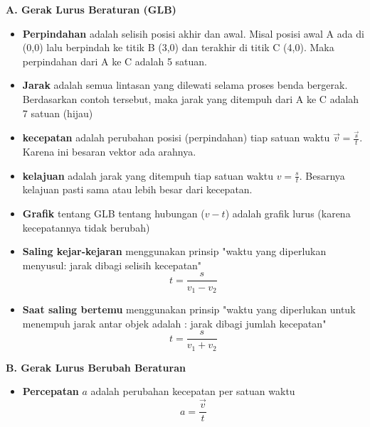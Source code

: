 \documentclass[10pt,a4paper]{article}
\begin{document}
\begin{multicols*}{2}
\begin{catatan}\textbf{A. Gerak Lurus Beraturan (GLB)}\end{catatan}
\begin{itemize}[itemsep=0mm,topsep=0mm,leftmargin=*]
\item \textbf{Perpindahan} adalah selisih posisi akhir dan awal. Misal posisi awal A ada di (0,0) lalu berpindah ke titik B (3,0) dan terakhir di titik C (4,0). Maka perpindahan dari A ke C adalah 5 satuan.
\item \textbf{Jarak} adalah semua lintasan yang dilewati selama proses benda bergerak. Berdasarkan contoh tersebut, maka jarak yang ditempuh dari A ke C adalah 7 satuan (hijau)

\item \textbf{kecepatan} adalah perubahan posisi (perpindahan) tiap satuan waktu $\vec{v} = \frac{\vec{s}}{t} $. Karena ini besaran vektor ada arahnya.
\item \textbf{kelajuan} adalah jarak yang ditempuh tiap satuan waktu $v =\frac{s}{t}$. Besarnya kelajuan pasti sama atau lebih besar dari kecepatan.

\item \textbf{Grafik} tentang GLB tentang hubungan ($v-t$) adalah grafik lurus (karena kecepatannya tidak berubah)

\item \textbf{Saling kejar-kejaran} menggunakan prinsip "waktu yang diperlukan menyusul: jarak dibagi selisih kecepatan" $$ t = \frac{s}{v_1-v_2}$$

\item \textbf{Saat saling bertemu} menggunakan prinsip "waktu yang diperlukan untuk menempuh jarak antar objek adalah : jarak dibagi jumlah kecepatan" $$ t = \frac{s}{v_1+v_2}$$ 

\end{itemize}

\begin{catatan}
\textbf{B. Gerak Lurus Berubah Beraturan}
\end{catatan}
\begin{itemize}[itemsep=0mm,topsep=0mm,leftmargin=*]
\item \textbf{Percepatan} $a$ adalah perubahan kecepatan per satuan waktu $$a = \frac{\vec{v}}{t}$$


\end{itemize}
\end{multicols*}
\end{document}
